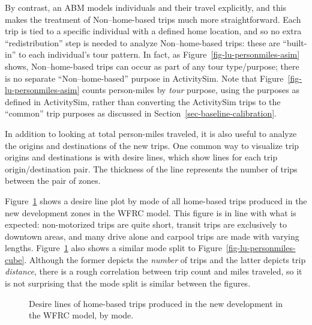 \documentclass[fancy, twoside, mastersfancy, ms]{byuthesis}
\begin{document}
By contrast, an ABM models individuals and their travel explicitly, and
this makes the treatment of Non--home-based trips much more
straightforward. Each trip is tied to a specific individual with a
defined home location, and so no extra ``redistribution'' step is needed
to analyze Non--home-based trips: these are ``built-in'' to each
individual's tour pattern. In fact, as
Figure~\ref{fig-lu-personmiles-asim} shows, Non--home-based trips can
occur as part of any tour type/purpose; there is no separate
``Non--home-based'' purpose in ActivitySim. Note that
Figure~\ref{fig-lu-personmiles-asim} counts person-miles by \emph{tour}
purpose, using the purposes as defined in ActivitySim, rather than
converting the ActivitySim trips to the ``common'' trip purposes as
discussed in Section~\ref{sec-baseline-calibration}.

In addition to looking at total person-miles traveled, it is also useful
to analyze the origins and destinations of the new trips. One common way
to visualize trip origins and destinations is with desire lines, which
show lines for each trip origin/destination pair. The thickness of the
line represents the number of trips between the pair of zones.

Figure~\ref{fig-lu-desire-cube-hb} shows a desire line plot by mode of
all home-based trips produced in the new development zones in the WFRC
model. This figure is in line with what is expected: non-motorized trips
are quite short, transit trips are exclusively to downtown areas, and
many drive alone and carpool trips are made with varying lengths.
Figure~\ref{fig-lu-desire-cube-hb} also shows a similar mode split to
Figure~\ref{fig-lu-personmiles-cube}. Although the former depicts the
\emph{number} of trips and the latter depicts trip \emph{distance},
there is a rough correlation between trip count and miles traveled, so
it is not surprising that the mode split is similar between the figures.

\begin{figure}


\caption[Desire lines of home-based trips made in the WFRC
model.]{\label{fig-lu-desire-cube-hb}Desire lines of home-based trips
produced in the new development in the WFRC model, by mode.}

\end{figure}%
\end{document}
